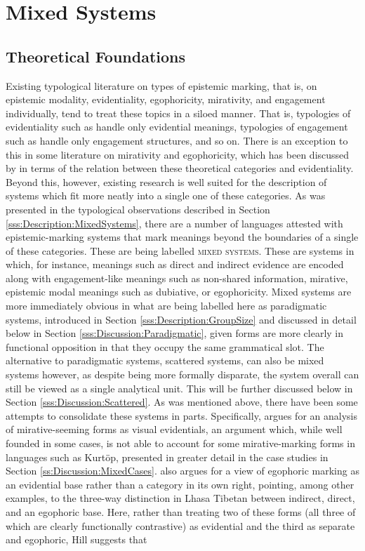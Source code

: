 \section{Mixed Systems}\label{s:Discussion:Mixed}
\subsection{Theoretical Foundations}\label{ss:Discussion:MixedFoundation}
Existing typological literature on types of epistemic marking, that is, on epistemic modality, evidentiality, egophoricity, mirativity, and engagement individually, tend to treat these topics in a siloed manner. That is, typologies of evidentiality such as  handle only evidential meanings, typologies of engagement such as  handle only engagement structures, and so on. There is an exception to this in some literature on mirativity and egophoricity, which has been discussed by  in terms of the relation between these theoretical categories and evidentiality. Beyond this, however, existing research is well suited for the description of systems which fit more neatly into a single one of these categories. As was presented in the typological observations described in Section \ref{sss:Description:MixedSystems}, there are a number of languages attested with epistemic-marking systems that mark meanings beyond the boundaries of a single of these categories. These are being labelled \textsc{mixed systems}. These are systems in which, for instance, meanings such as direct and indirect evidence are encoded along with engagement-like meanings such as non-shared information, mirative, epistemic modal meanings such as dubiative, or egophoricity. Mixed systems are more immediately obvious in what are being labelled here as paradigmatic systems, introduced in Section \ref{sss:Description:GroupSize} and discussed in detail below in Section \ref{sss:Discussion:Paradigmatic}, given forms are more clearly in functional opposition in that they occupy the same grammatical slot. The alternative to paradigmatic systems, scattered systems, can also be mixed systems however, as despite being more formally disparate, the system overall can still be viewed as a single analytical unit. This will be further discussed below in Section \ref{sss:Discussion:Scattered}. As was mentioned above, there have been some attempts to consolidate these systems in parts. Specifically,  argues for an analysis of mirative-seeming forms as visual evidentials, an argument which, while well founded in some cases, is not able to account for some mirative-marking forms in languages such as Kurtöp, presented in greater detail in the case studies in Section \ref{ss:Discussion:MixedCases}.  also argues for a view of egophoric marking as an evidential base rather than a category in its own right, pointing, among other examples, to the three-way distinction in Lhasa Tibetan between indirect, direct, and an egophoric base. Here, rather than treating two of these forms (all three of which are clearly functionally contrastive) as evidential and the third as separate and egophoric, Hill suggests that 